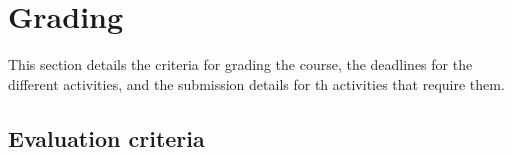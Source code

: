 \documentclass[a4paper]{article}
\begin{document}
%     
% 
% 
% 
% 
% 
%   
% 




\section{Grading}

This section details the criteria for grading the course, the deadlines for the different activities, and the submission details for th activities that require them.

\subsection{Evaluation criteria}
\label{sub:evaluation-criteria}
\end{document}
